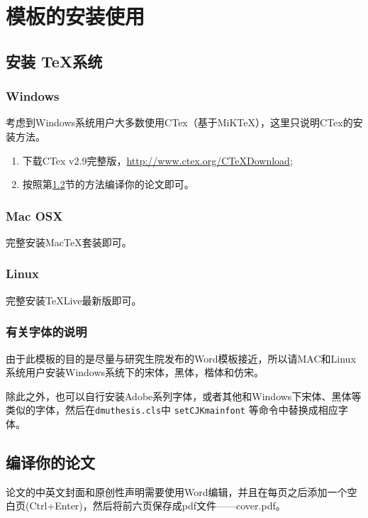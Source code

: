 
\chapter{模板的安装使用}\label{ch:install}

\section{安装 \TeX 系统}
\subsection{Windows}
考虑到Windows系统用户大多数使用CTex（基于MiKTeX），这里只说明CTex的安装方法。
\begin{enumerate}
\item 下载CTex v2.9完整版，\url{http://www.ctex.org/CTeXDownload};
\item 按照第\ref{sect:compile}节的方法编译你的论文即可。
\end{enumerate}

\subsection{Mac OSX}

完整安装MacTeX套装即可。

\subsection{Linux}

完整安装TeXLive最新版即可。

\subsection{有关字体的说明}
{\heiti 由于此模板的目的是尽量与研究生院发布的Word}模板接近\cite{Donoho2004}，所以请MAC和Linux系统用户安装Windows系统下的宋体，黑体，楷体和仿宋。

除此之外，也可以自行安装Adobe系列字体\cite{Li2010,Lin2007}，或者其他和Windows下宋体、黑体等类似的字体，然后在\texttt{dmuthesis.cls}中 \texttt{setCJKmainfont} 等命令中替换成相应字体。


\section{编译你的论文}\label{sect:compile}

论文的中英文封面和原创性声明需要使用Word编辑，并\cite{Schneider2010}且在每页之后添加一个空白页(Ctrl+Enter)，然后将前六页保存成pdf文件——cover.pdf。

